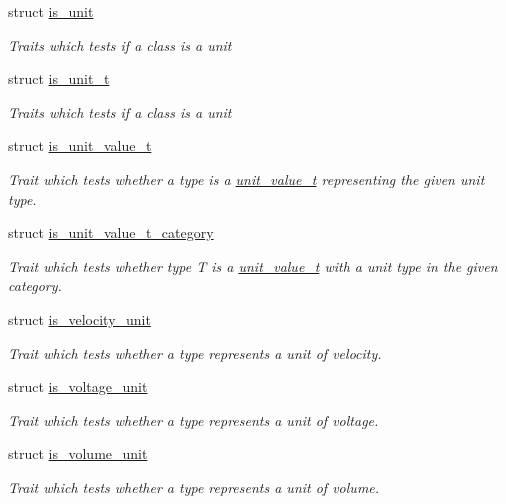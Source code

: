 \begin{DoxyCompactItemize}
struct \hyperlink{structunits_1_1traits_1_1is__unit}{is\+\_\+unit}
\begin{DoxyCompactList}\small\item\em Traits which tests if a class is a {\ttfamily unit} \end{DoxyCompactList}\item 
struct \hyperlink{structunits_1_1traits_1_1is__unit__t}{is\+\_\+unit\+\_\+t}
\begin{DoxyCompactList}\small\item\em Traits which tests if a class is a {\ttfamily unit} \end{DoxyCompactList}\item 
struct \hyperlink{structunits_1_1traits_1_1is__unit__value__t}{is\+\_\+unit\+\_\+value\+\_\+t}
\begin{DoxyCompactList}\small\item\em Trait which tests whether a type is a \hyperlink{structunits_1_1unit__value__t}{unit\+\_\+value\+\_\+t} representing the given unit type. \end{DoxyCompactList}\item 
struct \hyperlink{structunits_1_1traits_1_1is__unit__value__t__category}{is\+\_\+unit\+\_\+value\+\_\+t\+\_\+category}
\begin{DoxyCompactList}\small\item\em Trait which tests whether type T is a \hyperlink{structunits_1_1unit__value__t}{unit\+\_\+value\+\_\+t} with a unit type in the given category. \end{DoxyCompactList}\item 
struct \hyperlink{structunits_1_1traits_1_1is__velocity__unit}{is\+\_\+velocity\+\_\+unit}
\begin{DoxyCompactList}\small\item\em Trait which tests whether a type represents a unit of velocity. \end{DoxyCompactList}\item 
struct \hyperlink{structunits_1_1traits_1_1is__voltage__unit}{is\+\_\+voltage\+\_\+unit}
\begin{DoxyCompactList}\small\item\em Trait which tests whether a type represents a unit of voltage. \end{DoxyCompactList}\item 
struct \hyperlink{structunits_1_1traits_1_1is__volume__unit}{is\+\_\+volume\+\_\+unit}
\begin{DoxyCompactList}\small\item\em Trait which tests whether a type represents a unit of volume. \end{DoxyCompactList}\item 

\end{DoxyCompactItemize}
